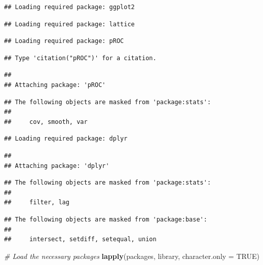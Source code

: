 \documentclass[
]{article}
\newenvironment{Shaded}{\begin{snugshade}}{\end{snugshade}}
\newcommand{\AttributeTok}[1]{\textcolor[rgb]{0.13,0.29,0.53}{#1}}
\newcommand{\CommentTok}[1]{\textcolor[rgb]{0.56,0.35,0.01}{\textit{#1}}}
\newcommand{\ConstantTok}[1]{\textcolor[rgb]{0.56,0.35,0.01}{#1}}
\newcommand{\FunctionTok}[1]{\textcolor[rgb]{0.13,0.29,0.53}{\textbf{#1}}}
\newcommand{\NormalTok}[1]{#1}
\begin{document}
\begin{verbatim}
## Loading required package: ggplot2
\end{verbatim}

\begin{verbatim}
## Loading required package: lattice
\end{verbatim}

\begin{verbatim}
## Loading required package: pROC
\end{verbatim}

\begin{verbatim}
## Type 'citation("pROC")' for a citation.
\end{verbatim}

\begin{verbatim}
## 
## Attaching package: 'pROC'
\end{verbatim}

\begin{verbatim}
## The following objects are masked from 'package:stats':
## 
##     cov, smooth, var
\end{verbatim}

\begin{verbatim}
## Loading required package: dplyr
\end{verbatim}

\begin{verbatim}
## 
## Attaching package: 'dplyr'
\end{verbatim}

\begin{verbatim}
## The following objects are masked from 'package:stats':
## 
##     filter, lag
\end{verbatim}

\begin{verbatim}
## The following objects are masked from 'package:base':
## 
##     intersect, setdiff, setequal, union
\end{verbatim}

\begin{Shaded}
\begin{Highlighting}[]
\CommentTok{\# Load the necessary packages}
\FunctionTok{lapply}\NormalTok{(packages, library, }\AttributeTok{character.only =} \ConstantTok{TRUE}\NormalTok{)}
\end{Highlighting}
\end{Shaded}
\end{document}
